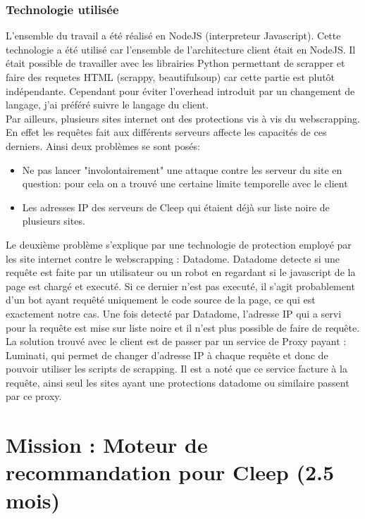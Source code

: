 \documentclass{article} %
\begin{document}
\subsubsection{Technologie utilisée\\}
L'ensemble du travail a été réalisé en NodeJS (interpreteur Javascript). Cette technologie a été utilisé car l'ensemble de l'architecture client était en NodeJS. Il était possible de travailler avec les librairies Python permettant de scrapper et faire des requetes HTML (scrappy, beautifulsoup) car cette partie est plutôt indépendante. Cependant pour éviter l'overhead introduit par un changement de langage, j'ai préféré suivre le langage du client.\\
Par ailleurs, plusieurs sites internet ont des protections vis à vis du webscrapping. En effet les requêtes fait aux différents serveurs affecte les capacités de ces derniers. Ainsi deux problèmes se sont posés:
\begin{itemize}
	\itemsep 0em
	\item Ne pas lancer "involontairement" une attaque contre les serveur du site en question: pour cela on a trouvé une certaine limite temporelle avec le client
	\item Les adresses IP des serveurs de Cleep qui étaient déjà sur liste noire de plusieurs sites.
\end{itemize}

Le deuxième problème s'explique par une technologie de protection employé par les site internet contre le webscrapping : Datadome. Datadome detecte si une requête est faite par un utilisateur ou un robot en regardant si le javascript de la page est chargé et executé. Si ce dernier n'est pas executé, il s'agit probablement d'un bot ayant requêté uniquement le code source de la page, ce qui est exactement notre cas. Une fois detecté par Datadome, l'adresse IP qui a servi pour la requête est mise sur liste noire et il n'est plus possible de faire de requête.\\

La solution trouvé avec le client est de passer par un service de Proxy payant : Luminati, qui permet de changer d'adresse IP à chaque requête et donc de pouvoir utiliser les scripts de scrapping. Il est a noté que ce service facture à la requête, ainsi seul les sites ayant une protections datadome ou similaire passent par ce proxy.

\newpage

\section{Mission : Moteur de recommandation pour Cleep (2.5 mois)}
\end{document}
